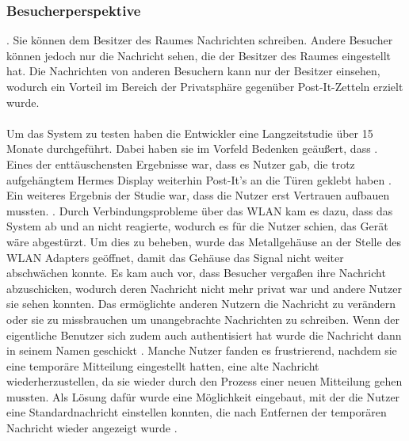 \subsubsection{Besucherperspektive}
. Sie können dem Besitzer des Raumes Nachrichten schreiben. Andere Besucher können jedoch nur die Nachricht sehen, die der Besitzer des Raumes eingestellt hat. Die Nachrichten von anderen Besuchern kann nur der Besitzer einsehen, wodurch ein Vorteil im Bereich der Privatsphäre gegenüber Post-It-Zetteln erzielt wurde.
\\
\\
Um das System zu testen haben die Entwickler eine Langzeitstudie über 15 Monate durchgeführt. Dabei haben sie im Vorfeld Bedenken geäußert, dass .
Eines der enttäuschensten Ergebnisse war, dass es Nutzer gab, die trotz aufgehängtem Hermes Display weiterhin Post-It's an die Türen geklebt haben \cite{cheverest:2003:paper}.
Ein weiteres Ergebnis der Studie war, dass die Nutzer erst Vertrauen aufbauen mussten. . Durch Verbindungsprobleme über das WLAN kam es dazu, dass das System ab und an nicht reagierte, wodurch es für die Nutzer schien, das Gerät wäre abgestürzt. Um dies zu beheben, wurde das Metallgehäuse an der Stelle des WLAN Adapters geöffnet, damit das Gehäuse das Signal nicht weiter abschwächen konnte.
Es kam auch vor, dass Besucher vergaßen ihre Nachricht abzuschicken, wodurch deren Nachricht nicht mehr privat war und andere Nutzer sie sehen konnten. Das ermöglichte anderen Nutzern die Nachricht zu verändern oder sie zu missbrauchen um unangebrachte Nachrichten zu schreiben. Wenn der eigentliche Benutzer sich zudem auch authentisiert hat wurde die Nachricht dann in seinem Namen geschickt \cite{cheverest:2003:article}.
Manche Nutzer fanden es frustrierend, nachdem sie eine temporäre Mitteilung eingestellt hatten, eine alte Nachricht wiederherzustellen, da sie wieder durch den Prozess einer neuen Mitteilung gehen mussten. Als Lösung dafür wurde eine Möglichkeit eingebaut, mit der die Nutzer eine Standardnachricht einstellen konnten, die nach Entfernen der temporären Nachricht wieder angezeigt wurde \cite{cheverest:2003:article}.
\\

